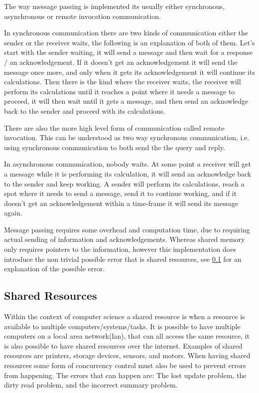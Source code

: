 The way message passing is implemented its usually either synchronous, asynchronous or remote invocation communication. 

In synchronous communication there are two kinds of communication either the sender or the receiver waits, the following is an explanation of both of them.
Let's start with the sender waiting, it will send a message and then wait for a response / an acknowledgement. If it doesn't get an acknowledgement it will send the message once more, and only when it gets its acknowledgement it will continue its calculations. 
Then there is the kind where the receiver waits, the receiver will perform its calculations until it reaches a point where it needs a message to proceed, it will then wait until it gets a message, and then send an acknowledge back to the sender and proceed with its calculations. 

There are also the more high level form of communication called remote invocation. This can be understood as two way synchronous communication, i.e. using synchronous communication to both send the the query and reply.

In asynchronous communication, nobody waits. At some point a receiver will get a message while it is performing its calculation, it will send an acknowledge back to the sender and keep working. A sender will perform its calculations, reach a spot where it needs to send a message, send it to continue working, and if it doesn't get an acknowledgement within a time-frame it will send its message again.

Message passing requires some overhead and computation time, due to requiring actual sending of information and acknowledgements. Whereas shared memory only requires pointers to the information, however this implementation does introduce the non trivial possible error that is shared resources, see \ref{sharedReources} for an explanation of the possible error.



\subsection{Shared Resources}\label{sharedReources}
Within the context of computer science a shared resource is when a resource is available to multiple computers/systems/tasks. It is possible to have multiple computers on a local area network(lan), that can all access the same resource, it is also possible to have shared resources over the internet. Examples of shared resources are printers, storage devices, sensors, and motors.
When having shared resources some form of concurrency control must also be used to prevent errors from happening. The errors that can happen are: The lost update problem, the dirty read problem, and the incorrect summary problem.

